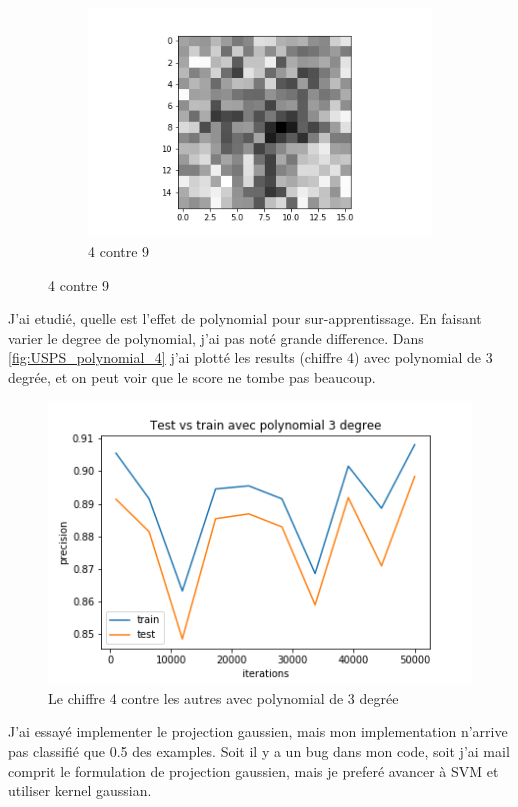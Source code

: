 \documentclass[a4paper,12pt]{article}
\begin{document}
\begin{figure}[h!]
\begin{subfigure}{.33\textwidth}
  \centering
	\includegraphics[width=\linewidth]{images/tme4/weight_w49.png}
	\caption{4 contre 9}
\end{subfigure}
\end{figure}

J'ai etudié, quelle est l'effet de polynomial pour sur-apprentissage. En faisant varier le degree de polynomial,
j'ai pas noté grande difference. Dans \autoref{fig:USPS_polynomial_4} j'ai plotté les results
 (chiffre 4)  avec polynomial de 3 degrée, et on peut voir que le score ne tombe pas beaucoup.

\begin{figure}[h!]
\caption{Le chiffre 4 contre les autres avec polynomial de 3 degrée}
\label{fig:USPS_polynomial_4}
\includegraphics[width=0.5\linewidth]{images/tme4/USPS_polynomial_4.png}
\centering
\end{figure}%

J'ai essayé implementer le projection gaussien, mais mon implementation n'arrive pas classifié que 0.5 des examples.
Soit il y a un bug dans mon code, soit j'ai mail comprit le formulation de projection gaussien, mais je preferé avancer à
SVM et utiliser kernel gaussian.
\end{document}
